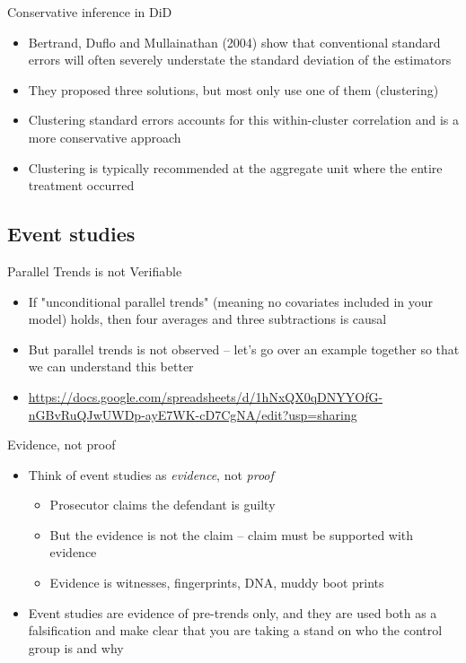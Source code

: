 \documentclass{beamer}
\begin{document}
\begin{frame}{Conservative inference in DiD}
  \begin{itemize}
	\item  Bertrand, Duflo and Mullainathan (2004) show that conventional standard errors will often severely understate the standard deviation of the estimators
	\item They proposed three solutions, but most only use one of them (clustering)
	    \item Clustering standard errors accounts for this within-cluster correlation and is a more conservative approach 
	    \item Clustering is typically recommended at the aggregate unit where the entire treatment occurred

  \end{itemize}
\end{frame}




\subsection{Event studies}

\begin{frame}{Parallel Trends is not Verifiable}

\begin{itemize}
\item If "unconditional parallel trends" (meaning no covariates included in your model) holds, then four averages and three subtractions is causal
\item But parallel trends is not observed -- let's go over an example together so that we can understand this better
\item \url{https://docs.google.com/spreadsheets/d/1hNxQX0qDNYYOfG-nGBvRuQJwUWDp-ayE7WK-cD7CgNA/edit?usp=sharing}
\end{itemize}

\end{frame}


\begin{frame}{Evidence, not proof}

\begin{itemize}
\item Think of event studies as \emph{evidence}, not \emph{proof}
	\begin{itemize}
	\item Prosecutor claims the defendant is guilty
	\item But the evidence is not the claim -- claim must be supported with evidence
	\item Evidence is witnesses, fingerprints, DNA, muddy boot prints
	\end{itemize}
\item Event studies are evidence of pre-trends only, and they are used both as a falsification and make clear that you are taking a stand on who the control group is and why
\end{itemize}
\end{frame}
\end{document}
